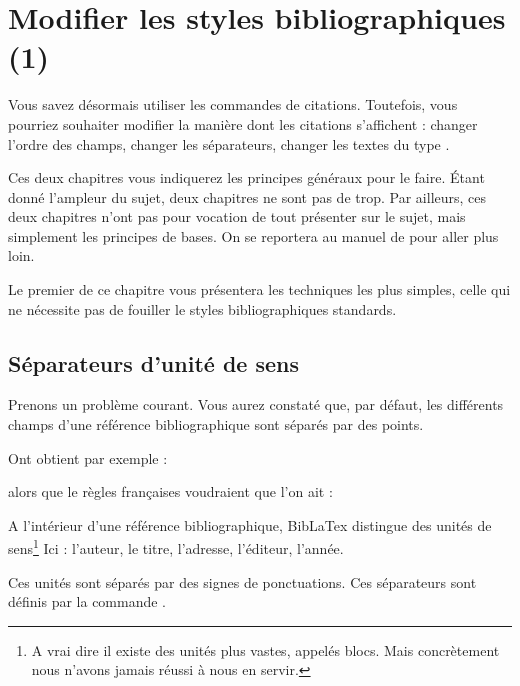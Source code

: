 \chapter{Modifier les styles bibliographiques (1)}

	\begin{prealable}
	
	Vous savez désormais utiliser les commandes de citations. Toutefois, vous pourriez souhaiter modifier la manière dont les citations s'affichent :  changer l'ordre des champs, changer les séparateurs, changer les textes du type .
	
	Ces deux chapitres vous indiquerez les principes généraux pour le faire. Étant donné l'ampleur du sujet, deux chapitres ne sont pas de trop. Par ailleurs, ces deux chapitres n'ont pas pour vocation de tout présenter sur le sujet, mais simplement les principes de bases. On se reportera au manuel de  pour aller plus loin.
	
	Le premier de ce chapitre vous présentera les techniques les plus simples, celle qui ne nécessite pas de fouiller le styles bibliographiques standards. 
	
	
	\end{prealable}
	
	
	\section{Séparateurs d'unité de sens}
	
Prenons un problème courant. Vous aurez constaté que, par défaut, les différents champs d'une référence bibliographique sont séparés par des points.

	Ont obtient par exemple :
	\begin{quotation}
	\cite{Marrou}
	\end{quotation}
	
	alors que le règles françaises voudraient que l'on ait :
	
	\begin{quotation}
	\cite{Marrou}
	\end{quotation}
	
A l'intérieur d'une référence bibliographique, BibLaTex distingue des unités de sens\footnote{A vrai dire il existe des unités plus vastes, appelés blocs. Mais concrètement nous n'avons jamais réussi à nous en servir.} Ici : l'auteur, le titre, l'adresse, l'éditeur, l'année. 

	Ces unités sont séparés par des signes de ponctuations. Ces séparateurs sont définis par la commande .
	
